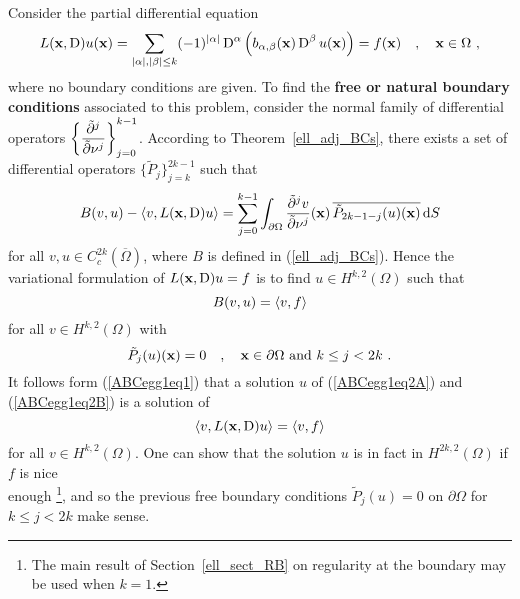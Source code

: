 \begin{egg}
Consider the partial differential equation
\begin{equation} \label{ABCegg1eq0}
L(\mathbf{x}, \operatorname{D})u(\mathbf{x}) = \sum_{|\alpha|,|\beta|\leq k}
(-1)^{|\alpha|} \operatorname{D}^\alpha
\left( b_{\alpha,\beta}(\mathbf{x}) \operatorname{D}^\beta u(\mathbf{x})\right) = f(\mathbf{x})
\quad , \quad \mathbf{x} \in \Omega \ ,
\end{equation}
where no boundary conditions are given.  To find the
{\bfseries free or natural boundary conditions}%
%
associated to this
problem, consider the normal family of differential operators 
$\displaystyle \left\{ \frac{\tilde{\partial}^{j}{}}{\tilde{\partial}{\mathbf{\nu}}^{j}} \right\}_{j=0}^{k-1}$.
According to Theorem~\ref{ell_adj_BCs}, there exists a set of
differential operators $\displaystyle \{ \tilde{P}_j\}_{j=k}^{2k-1}$
such that
\begin{equation} \label{ABCegg1eq1}
B(v,u) - \left\langle{v} , {L(\mathbf{x},\operatorname{D})u}\right\rangle =
\sum_{j=0}^{k-1} \int_{\partial \Omega} \frac{\tilde{\partial}^{j}{v}}{\tilde{\partial}{\mathbf{\nu}}^{j}}(\mathbf{x}) \,
\overline{\tilde{P}_{2k-1-j}(u)(\mathbf{x})} \,\mathrm{d}{S}
\end{equation}
for all $\displaystyle v,u \in C^{2k}_c(\overline{\Omega})$,
where $B$ is defined in (\ref{ell_adj_BCs}).
Hence the variational formulation of $L(\mathbf{x},\operatorname{D})u=f$ is to find
$\displaystyle u\in H^{k,2}(\Omega)$ such that
\begin{equation} \label{ABCegg1eq2A}
B(v,u) = \left\langle{v} , {f}\right\rangle
\end{equation}
for all $\displaystyle v\in H^{k,2}(\Omega)$ with
\begin{equation} \label{ABCegg1eq2B}
\tilde{P}_{j}(u)(\mathbf{x}) = 0 \quad , \quad \mathbf{x} \in \partial \Omega \
\text{and} \ k\leq j < 2k \ .
\end{equation}
It follows form (\ref{ABCegg1eq1}) that a solution $u$ of
(\ref{ABCegg1eq2A}) and (\ref{ABCegg1eq2B}) is a solution of
\[
\left\langle{v} , {L(\mathbf{x},\operatorname{D})u}\right\rangle = \left\langle{v} , {f}\right\rangle
\]
for all $\displaystyle  v\in H^{k,2}(\Omega)$.
One can show that the solution $u$ is in fact in
$\displaystyle H^{2k,2}(\Omega)$ if $f$ is nice\\
enough \footnote{The main result of Section~\ref{ell_sect_RB} on
regularity at the boundary may be used when $k=1$.}, and so the
previous free boundary conditions $\tilde{P}_{j}(u) = 0$ on
$\partial \Omega$ for $k \leq j < 2k$ make sense.
\end{egg}

